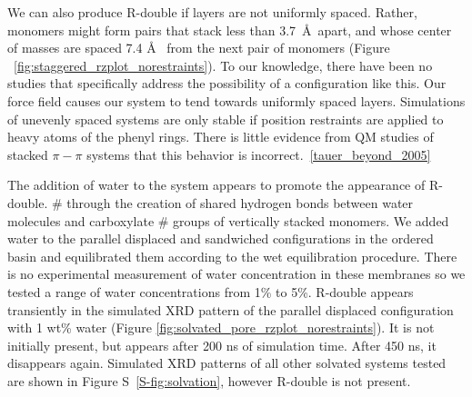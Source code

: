 \documentclass[journal=jpcbfk,manuscript=article]{achemso}
\begin{document}
  We can also produce R-double if layers are not uniformly spaced. Rather,
  monomers might form pairs that stack less than 3.7~\AA~apart, and whose center
  of masses are spaced 7.4 \AA~ from the next pair of monomers (Figure
  ~\ref{fig:staggered_rzplot_norestraints}). To our knowledge, there have been no
  studies that specifically address the possibility of a configuration like this.
  Our force field causes our system to tend towards uniformly spaced layers.
  Simulations of unevenly spaced systems are only stable if position restraints
  are applied to heavy atoms of the phenyl rings.  There is little evidence from
  QM studies of stacked $\pi-\pi$ systems that this behavior is
  incorrect.~\ref{tauer_beyond_2005} 
  
  The addition of water to the system appears to promote the appearance of R-double.
#  through the creation of shared hydrogen bonds between water molecules and carboxylate
#  groups of vertically stacked monomers. 
  We added water to the parallel displaced and sandwiched
  configurations in the ordered basin and equilibrated them according to the wet
  equilibration procedure. There is no experimental measurement of water
  concentration in these membranes so we tested a range of water concentrations
  from 1\% to 5\%. R-double appears transiently in the simulated XRD pattern of
  the parallel displaced configuration with 1 wt\% water (Figure
  \ref{fig:solvated_pore_rzplot_norestraints}). It is not initially present, but
  appears after 200 ns of simulation time. After 450 ns, it disappears again.
  Simulated XRD patterns of all other solvated systems tested are shown in Figure
  S~\ref{S-fig:solvation}, however R-double is not present.
\end{document}

